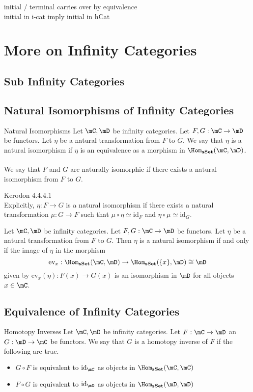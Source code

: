 \documentclass[a4paper]{article}
\begin{document}
initial / terminal carries over by equivalence\\

initial in i-cat imply initial in hCat

\pagebreak
\section{More on Infinity Categories}
\subsection{Sub Infinity Categories}

\subsection{Natural Isomorphisms of Infinity Categories}
\begin{defn}{Natural Isomorphisms}{} Let $\mC,\mD$ be infinity categories. Let $F,G:\mC\to\mD$ be functors. Let $\eta$ be a natural transformation from $F$ to $G$. We say that $\eta$ is a natural isomorphism if $\eta$ is an equivalence as a morphism in $\Hom_\bold{sSet}(\mC,\mD)$. \\~\\

We say that $F$ and $G$ are naturally isomorphic if there exists a natural isomorphism from $F$ to $G$. 
\end{defn}

Kerodon 4.4.4.1\\

Explicitly, $\eta:F\to G$ is a natural isomorphism if there exists a natural transformation $\mu:G\to F$ such that $\mu\circ\eta\simeq\text{id}_F$ and $\eta\circ\mu\simeq\text{id}_G$. 

\begin{prp}{}{} Let $\mC,\mD$ be infinity categories. Let $F,G:\mC\to\mD$ be functors. Let $\eta$ be a natural transformation from $F$ to $G$. Then $\eta$ is a natural isomorphism if and only if the image of $\eta$ in the morphism $$\text{ev}_x:\Hom_\bold{sSet}(\mC,\mD)\to\Hom_\bold{sSet}(\{x\},\mD)\cong\mD$$ given by $\text{ev}_x(\eta):F(x)\to G(x)$ is an isomorphism in $\mD$ for all objects $x\in\mC$. 
\end{prp}

\subsection{Equivalence of Infinity Categories}
\begin{defn}{Homotopy Inverses}{} Let $\mC,\mD$ be infinity categories. Let $F:\mC\to\mD$ an $G:\mD\to\mC$ be functors. We say that $G$ is a homotopy inverse of $F$ if the following are true. 
\begin{itemize}
\item $G\circ F$ is equivalent to $\text{id}_\mC$ as objects in $\Hom_\bold{sSet}(\mC,\mC)$
\item $F\circ G$ is equivalent to $\text{id}_\mD$ as objects in $\Hom_\bold{sSet}(\mD,\mD)$
\end{itemize}
\end{defn}
\end{document}

